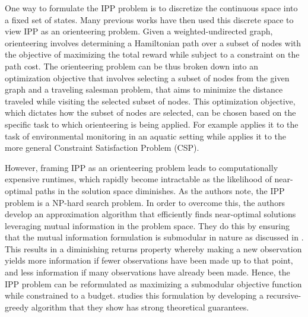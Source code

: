 

One way to formulate the IPP problem is to discretize the continuous space into a fixed set of states. Many previous works have then used this discrete space to view IPP as an orienteering problem. Given a weighted-undirected graph, orienteering involves determining a Hamiltonian path over a subset of nodes with the objective of maximizing the total reward while subject to a constraint on the path cost. The orienteering problem can be thus broken down into an optimization objective that involves selecting a subset of nodes from the given graph and a traveling salesman problem, that aims to minimize the distance traveled while visiting the selected subset of nodes. This optimization objective, which dictates how the subset of nodes are selected, can be chosen based on the specific task to which orienteering is being applied. For example \cite{lorenzo_orienteering} applies it to the task of environmental monitoring in an aquatic setting while \cite{arora_randomized_2017} applies it to the more general Constraint Satisfaction Problem (CSP). 

However, framing IPP as an orienteering problem leads to computationally expensive runtimes, which rapidly become intractable as the likelihood of near-optimal paths in the solution space diminishes. As the authors \cite{efficient-sensing} note, the IPP problem is a NP-hard search problem. In order to overcome this, the authors develop an approximation algorithm that efficiently finds near-optimal solutions leveraging mutual information in the problem space. They do this by ensuring that the mutual information formulation is submodular in nature as discussed in \cite{submodular-krause}. This results in a diminishing returns property whereby making a new observation yields more information if fewer observations have been made up to that point, and less information if many observations have already been made. Hence, the IPP problem can be reformulated as maximizing a submodular objective function while constrained to a budget. \cite{recursive_greedy} studies this formulation by developing a recursive-greedy algorithm that they show has strong theoretical guarantees.

